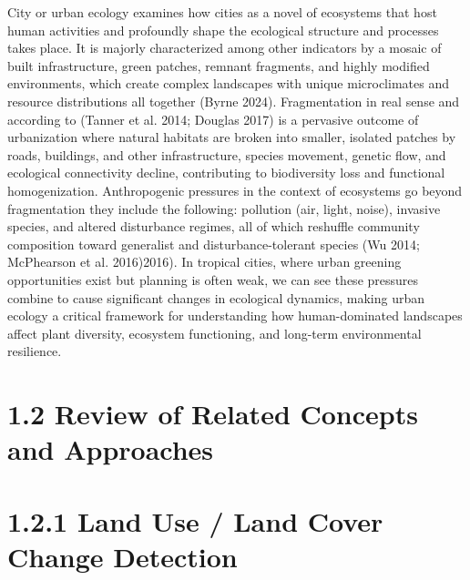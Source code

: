 City or urban ecology examines how cities as a novel of ecosystems that host human activities and profoundly shape the ecological structure and processes takes place. It is majorly characterized among other indicators by a mosaic of built infrastructure, green patches, remnant fragments, and highly modified environments, which create complex landscapes with unique microclimates and resource distributions all together (Byrne 2024). Fragmentation in real sense and according to (Tanner et al. 2014; Douglas 2017) is a pervasive outcome of urbanization where natural habitats are broken into smaller, isolated patches by roads, buildings, and other infrastructure, species movement, genetic flow, and ecological connectivity decline, contributing to biodiversity loss and functional homogenization. Anthropogenic pressures in the context of ecosystems go beyond fragmentation they include the following: pollution (air, light, noise), invasive species, and altered disturbance regimes, all of which reshuffle community composition toward generalist and disturbance-tolerant species (Wu 2014; McPhearson et al. 2016)2016). In tropical cities, where urban greening opportunities exist but planning is often weak, we can see these pressures combine to cause significant changes in ecological dynamics, making urban ecology a critical framework for understanding how human-dominated landscapes affect plant diversity, ecosystem functioning, and long-term environmental resilience.
\hypertarget{review-of-related-concepts-and-approaches}{%
\section{\texorpdfstring{\textbf{1.2 Review of Related Concepts and Approaches}}{1.2 Review of Related Concepts and Approaches}}\label{review-of-related-concepts-and-approaches}}

\hypertarget{land-use-land-cover-change-detection}{%
\section{\texorpdfstring{\textbf{1.2.1 Land Use / Land Cover Change Detection}}{1.2.1 Land Use / Land Cover Change Detection}}\label{land-use-land-cover-change-detection}}

